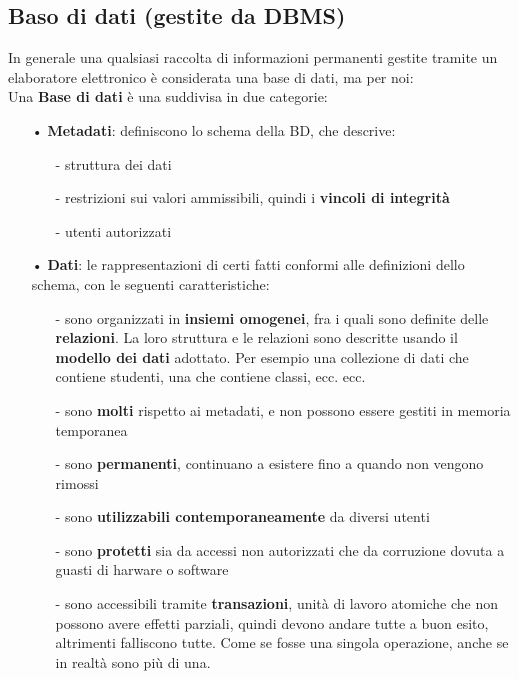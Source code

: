 \documentclass[12pt, letterpaper]{article}
\begin{document}
\subsection{Baso di dati (gestite da DBMS)}
In generale una qualsiasi raccolta di informazioni permanenti gestite tramite un elaboratore elettronico è 
considerata una base di dati, ma per noi:
\\
Una \textbf{Base di dati} è una suddivisa in due categorie:
\begin{itemize}
   \item[•] \textbf{Metadati}: definiscono lo schema della BD, che descrive:
      \begin{itemize}
         \item[-] struttura dei dati
         \item[-] restrizioni sui valori ammissibili, quindi i \textbf{vincoli di integrità}
         \item[-] utenti autorizzati
      \end{itemize}
   \item[•] \textbf{Dati}: le rappresentazioni di certi fatti conformi alle definizioni dello schema, con le seguenti caratteristiche:
      \begin{itemize}
         \item[-] sono organizzati in \textbf{insiemi omogenei}, fra i quali sono definite delle \textbf{relazioni}.
            La loro struttura e le relazioni sono descritte usando il \textbf{modello dei dati }adottato. Per esempio una collezione di dati che contiene studenti, una che contiene classi, ecc. ecc.
         \item[-] sono \textbf{molti} rispetto ai metadati, e non possono essere gestiti in memoria temporanea
         \item[-] sono \textbf{permanenti}, continuano a esistere fino a quando non vengono rimossi
         \item[-] sono \textbf{utilizzabili contemporaneamente} da diversi utenti
         \item[-] sono \textbf{protetti} sia da accessi non autorizzati che da corruzione dovuta a guasti di harware o software
         \item[-] sono accessibili tramite \textbf{transazioni}, unità di lavoro atomiche che non possono avere effetti parziali, quindi devono andare tutte a buon esito, altrimenti falliscono tutte. Come se fosse una singola operazione, anche se in realtà sono più di una.
      \end{itemize}
\end{itemize}
\newpage
\end{document}
